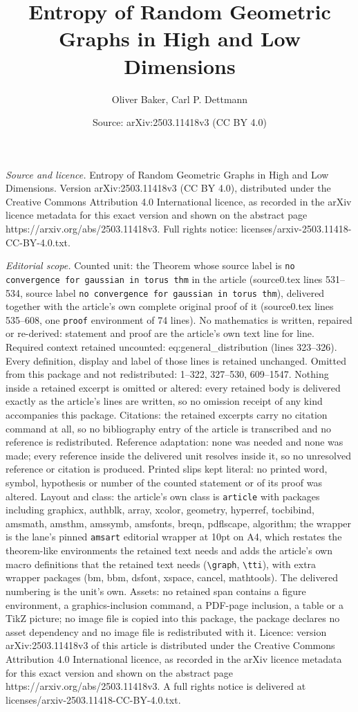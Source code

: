 \documentclass[10pt,a4paper]{amsart}
\title[Entropy of Random Geometric Graphs in High and Low Dimension]{Entropy of Random Geometric Graphs in High and Low Dimensions}
\author{Oliver Baker, Carl P. Dettmann}
\date{Source: arXiv:2503.11418v3 (CC BY 4.0)}
\begin{document}
\maketitle

\noindent\emph{Source and licence.} Entropy of Random Geometric Graphs in High and Low Dimensions. Version arXiv:2503.11418v3 (CC BY 4.0), distributed under the Creative Commons Attribution 4.0 International licence, as recorded in the arXiv licence metadata for this exact version and shown on the abstract page https://arxiv.org/abs/2503.11418v3. Full rights notice: licenses/arxiv-2503.11418-CC-BY-4.0.txt.\par\smallskip

\noindent\textit{Editorial scope.} Counted unit: the Theorem whose source label is \texttt{no convergence for gaussian in torus thm} in the article (source0.tex lines 531--534, source label \texttt{no convergence for gaussian in torus thm}), delivered together with the article's own complete original proof of it (source0.tex lines 535--608, one \texttt{proof} environment of 74 lines). No mathematics is written, repaired or re-derived: statement and proof are the article's own text line for line. Required context retained uncounted: eq:general\_distribution (lines 323--326). Every definition, display and label of those lines is retained unchanged. Omitted from this package and not redistributed: 1--322, 327--530, 609--1547. Nothing inside a retained excerpt is omitted or altered: every retained body is delivered exactly as the article's lines are written, so no omission receipt of any kind accompanies this package. Citations: the retained excerpts carry no citation command at all, so no bibliography entry of the article is transcribed and no reference is redistributed. Reference adaptation: none was needed and none was made; every reference inside the delivered unit resolves inside it, so no unresolved reference or citation is produced. Printed slips kept literal: no printed word, symbol, hypothesis or number of the counted statement or of its proof was altered. Layout and class: the article's own class is \texttt{article} with packages including graphicx, authblk, array, xcolor, geometry, hyperref, tocbibind, amsmath, amsthm, amssymb, amsfonts, breqn, pdflscape, algorithm; the wrapper is the lane's pinned \texttt{amsart} editorial wrapper at 10pt on A4, which restates the theorem-like environments the retained text needs and adds the article's own macro definitions that the retained text needs (\texttt{\textbackslash graph}, \texttt{\textbackslash tti}), with extra wrapper packages (bm, bbm, dsfont, xspace, cancel, mathtools). The delivered numbering is the unit's own. Assets: no retained span contains a figure environment, a graphics-inclusion command, a PDF-page inclusion, a table or a TikZ picture; no image file is copied into this package, the package declares no asset dependency and no image file is redistributed with it. Licence: version arXiv:2503.11418v3 of this article is distributed under the Creative Commons Attribution 4.0 International licence, as recorded in the arXiv licence metadata for this exact version and shown on the abstract page https://arxiv.org/abs/2503.11418v3. A full rights notice is delivered at licenses/arxiv-2503.11418-CC-BY-4.0.txt. 
\end{document}
